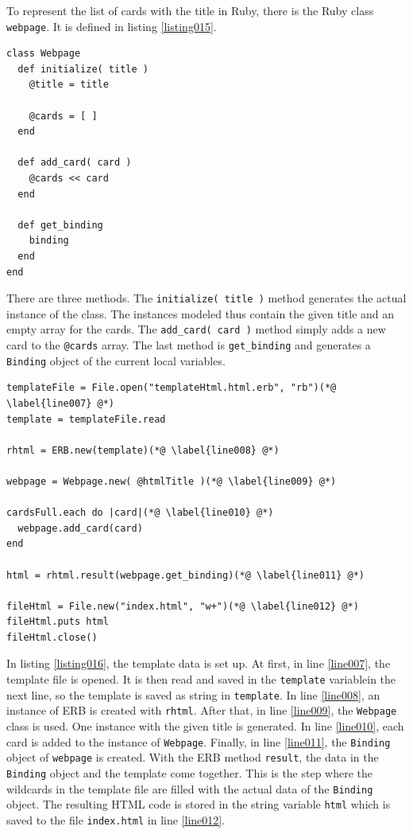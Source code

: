To represent the list of cards with the title in Ruby, there is the Ruby class \texttt{webpage}. It is defined in listing \ref{listing015}.

\begin{lstlisting}[aboveskip=1\baselineskip, caption=Generating HTML without a templating engine., label=listing015]
class Webpage
  def initialize( title )
    @title = title

    @cards = [ ]
  end

  def add_card( card )
    @cards << card
  end

  def get_binding
    binding
  end
end
\end{lstlisting}

There are three methods. The \lstinline{initialize( title )} method generates the actual instance of the class. The instances modeled thus contain the given title and an empty array for the cards. The \lstinline{add_card( card )} method simply adds a new card to the \lstinline{@cards} array. The last method is \lstinline{get_binding} and generates a \lstinline{Binding} object of the current local variables.

\begin{lstlisting}[aboveskip=1\baselineskip, caption=Generating HTML with ERB., label=listing016]
templateFile = File.open("templateHtml.html.erb", "rb")(*@ \label{line007} @*)
template = templateFile.read

rhtml = ERB.new(template)(*@ \label{line008} @*)

webpage = Webpage.new( @htmlTitle )(*@ \label{line009} @*)

cardsFull.each do |card|(*@ \label{line010} @*)
  webpage.add_card(card)
end

html = rhtml.result(webpage.get_binding)(*@ \label{line011} @*)

fileHtml = File.new("index.html", "w+")(*@ \label{line012} @*)
fileHtml.puts html
fileHtml.close()
\end{lstlisting}

In listing \ref{listing016}, the template data is set up. At first, in line \ref{line007}, the template file is opened. It is then read and saved in the \lstinline{template} variablein the next line, so the template is saved as string in \lstinline{template}. In line \ref{line008}, an instance of ERB is created with \lstinline{rhtml}. After that, in line \ref{line009}, the \lstinline{Webpage} class is used. One instance with the given title is generated. In line \ref{line010}, each card is added to the instance of \lstinline{Webpage}. Finally, in line \ref{line011}, the \lstinline{Binding} object of \lstinline{webpage} is created. With the ERB method \lstinline{result}, the data in the \lstinline{Binding} object and the template come together. This is the step where the wildcards in the template file are filled with the actual data of the \lstinline{Binding} object. The resulting HTML code is stored in the string variable \lstinline{html} which is saved to the file \texttt{index.html} in line \ref{line012}. 

